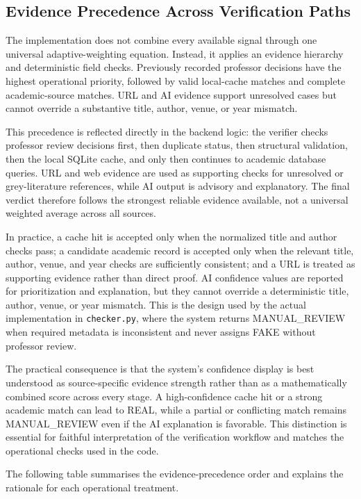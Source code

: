 \documentclass[12pt,a4paper,oneside]{report}
\begin{document}
\subsection{Evidence Precedence Across Verification Paths}
The implementation does not combine every available signal through one universal adaptive-weighting equation. Instead, it applies an evidence hierarchy and deterministic field checks. Previously recorded professor decisions have the highest operational priority, followed by valid local-cache matches and complete academic-source matches. URL and AI evidence support unresolved cases but cannot override a substantive title, author, venue, or year mismatch.

This precedence is reflected directly in the backend logic: the verifier checks professor review decisions first, then duplicate status, then structural validation, then the local SQLite cache, and only then continues to academic database queries. URL and web evidence are used as supporting checks for unresolved or grey-literature references, while AI output is advisory and explanatory. The final verdict therefore follows the strongest reliable evidence available, not a universal weighted average across all sources.

In practice, a cache hit is accepted only when the normalized title and author checks pass; a candidate academic record is accepted only when the relevant title, author, venue, and year checks are sufficiently consistent; and a URL is treated as supporting evidence rather than direct proof. AI confidence values are reported for prioritization and explanation, but they cannot override a deterministic title, author, venue, or year mismatch. This is the design used by the actual implementation in \texttt{checker.py}, where the system returns MANUAL\_REVIEW when required metadata is inconsistent and never assigns FAKE without professor review.

The practical consequence is that the system's confidence display is best understood as source-specific evidence strength rather than as a mathematically combined score across every stage. A high-confidence cache hit or a strong academic match can lead to REAL, while a partial or conflicting match remains MANUAL\_REVIEW even if the AI explanation is favorable. This distinction is essential for faithful interpretation of the verification workflow and matches the operational checks used in the code.

The following table summarises the evidence-precedence order and explains the rationale for each operational treatment.
\end{document}
